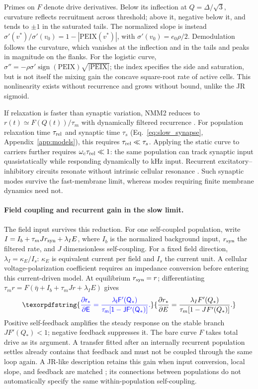 \documentclass[11pt,a4paper]{article}
\newcommand{\Sig}{\sigma}
\providecommand{\DIFaddtex}[1]{{\protect\color{blue} \sf #1}} %
\providecommand{\DIFdeltex}[1]{{\protect\color{red} \scriptsize #1}} %
\providecommand{\DIFaddbegin}{} %
\providecommand{\DIFaddend}{} %
\providecommand{\DIFdelbegin}{} %
\providecommand{\DIFdelend}{} %
\providecommand{\DIFadd}[1]{\texorpdfstring{\DIFaddtex{#1}}{#1}} %
\providecommand{\DIFdel}[1]{\texorpdfstring{\DIFdeltex{#1}}{}} %
\begin{document}
\DIFadd{Primes on $F$ denote drive derivatives. Below its inflection at
$Q=\Delta/\sqrt3$, curvature reflects recruitment across threshold;
}\DIFaddend above it, \DIFdelbegin \DIFdel{negative below it, and tends to $\pm1$
in the saturated tails.
The normalized slope is instead
$\Sig'(v^*)/\Sig'(v_0)=1-|\mathrm{PEIX}(v^*)|$, with
$\Sig'(v_0)=e_0\rho/2$. Demodulation follows the curvature,
which vanishes at
the inflection and in the tails and peaks in magnitude on the flanks.
For the
logistic curve, $\Sig''=-\rho\Sig'\operatorname{sign}(\mathrm{PEIX})\sqrt{|\mathrm{PEIX}|}$;
the index specifies the side and saturation, but is not itself the mixing gain }\DIFdelend \DIFaddbegin \DIFadd{the concave square-root rate of active cells. This nonlinearity
exists without recurrence and grows without bound, unlike the JR sigmoid.
}

\DIFadd{If relaxation is faster than synaptic variation, NMM2 reduces to
$r(t)\simeq F(Q(t))/\tau_m$ with dynamically filtered recurrence
\cite{ruffini2021nmm2,clusella2023}. For population relaxation time
$\tau_{\rm rel}$ and synaptic time $\tau_s$ (Eq.~\eqref{eq:slow_synapse},
Appendix~\ref{app:models}), this requires $\tau_{\rm rel}\ll\tau_s$.
Applying the static curve to carriers further requires
$\omega_c\tau_{\rm rel}\ll1$: the same population can track synaptic
input quasistatically while responding dynamically to kHz input.
Recurrent excitatory--inhibitory circuits resonate without intrinsic
cellular resonance \cite{brunelhakim1999,brunelwang2003}. Such synaptic
modes survive the fast-membrane limit, whereas modes requiring finite
membrane dynamics need not.
}

\paragraph{\DIFadd{Field coupling and recurrent gain in the slow limit.}}
\DIFadd{The field input survives this reduction. For one self-coupled population,
write $I=I_b+\tau_mJr_{\rm syn}+\lambda_I E$, where $I_b$ is the normalized
background input, $r_{\rm syn}$ the filtered rate, and $J$ dimensionless
self-coupling. For a fixed field direction, $\lambda_I=\kappa_E/I_s$:
$\kappa_E$ is equivalent current per field and $I_s$ the current unit.
A cellular voltage-polarization coefficient requires an impedance conversion
before entering this current-driven model. At equilibrium $r_{\rm syn}=r$;
differentiating $\tau_mr=F(\bar\eta+I_b+\tau_mJr+\lambda_IE)$ gives
}\begin{equation}
\DIFadd{\frac{\partial r_*}{\partial E}
=\frac{\lambda_I F'(Q_*)}{\tau_m[1-JF'(Q_*)]}.
\label{eq:slow-field-gain}
}\end{equation}
\DIFadd{Positive self-feedback amplifies the steady response on the stable branch
$JF'(Q_*)<1$; negative feedback suppresses it. The bare curve $F$ takes
total drive as its argument. A transfer fitted after an internally recurrent
population settles already contains that feedback and must not be coupled
through the same loop again. A JR-like description retains this gain when
input conversion, local slope, and feedback are matched
\cite{ruffini2021nmm2,clusella2023}; its connections between populations do
not automatically specify the same within-population self-coupling}\DIFaddend .
\end{document}
